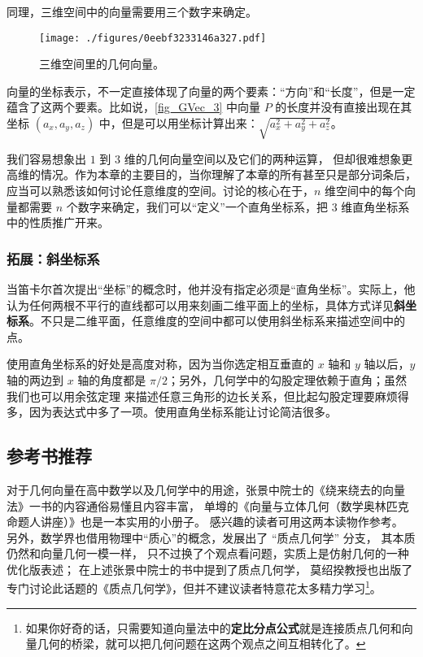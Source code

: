 同理，三维空间中的向量需要用三个数字来确定。

\begin{figure}[ht]
\centering
\texttt{[image: ./figures/0eebf3233146a327.pdf]}
\caption{三维空间里的几何向量。} \label{fig_GVec_3}
\end{figure}

向量的坐标表示，不一定直接体现了向量的两个要素：“方向”和“长度”，但是一定蕴含了这两个要素。比如说，\autoref{fig_GVec_3} 中向量 $P$ 的长度并没有直接出现在其坐标 $(a_x, a_y, a_z)$ 中，但是可以用坐标计算出来：$\sqrt{a_x^2+a_y^2+a_z^2}$。

我们容易想象出 $1$ 到 $3$ 维的几何向量空间以及它们的两种运算， 但却很难想象更高维的情况。作为本章的主要目的，当你理解了本章的所有甚至只是部分词条后，应当可以熟悉该如何讨论任意维度的空间。讨论的核心在于，$n$ 维空间中的每个向量都需要 $n$ 个数字来确定，我们可以“定义”一个直角坐标系，把 $3$ 维直角坐标系中的性质推广开来。

\subsubsection{拓展：斜坐标系}

当笛卡尔首次提出“坐标”的概念时，他并没有指定必须是“直角坐标”。实际上，他认为任何两根不平行的直线都可以用来刻画二维平面上的坐标，具体方式详见\textbf{斜坐标系}。不只是二维平面，任意维度的空间中都可以使用斜坐标系来描述空间中的点。

使用直角坐标系的好处是高度对称，因为当你选定相互垂直的 $x$ 轴和 $y$ 轴以后，$y$ 轴的两边到 $x$ 轴的角度都是 $\pi/2$；另外，几何学中的勾股定理依赖于直角；虽然我们也可以用余弦定理%
来描述任意三角形的边长关系，但比起勾股定理要麻烦得多，因为表达式中多了一项。使用直角坐标系能让讨论简洁很多。

\subsection{参考书推荐}
对于几何向量在高中数学以及几何学中的用途，张景中院士的《绕来绕去的向量法》一书的内容通俗易懂且内容丰富， 单墫的《向量与立体几何（数学奥林匹克命题人讲座）》也是一本实用的小册子。 感兴趣的读者可用这两本读物作参考。 另外，数学界也借用物理中“质心”的概念，发展出了 “质点几何学” 分支， 其本质仍然和向量几何一模一样， 只不过换了个观点看问题，实质上是仿射几何的一种优化版表述； 在上述张景中院士的书中提到了质点几何学， 莫绍揆教授也出版了专门讨论此话题的《质点几何学》，但并不建议读者特意花太多精力学习\footnote{如果你好奇的话，只需要知道向量法中的\textbf{定比分点公式}就是连接质点几何和向量几何的桥梁，就可以把几何问题在这两个观点之间互相转化了。}。

